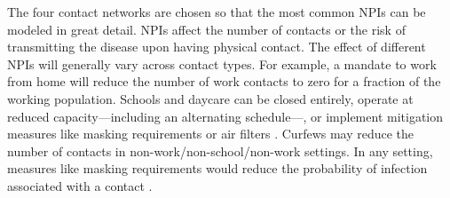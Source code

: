 The four contact networks are chosen so that the most common NPIs can be modeled in
great detail. NPIs affect the number of contacts or the risk of transmitting the disease
upon having physical contact. The effect of different NPIs will generally vary across
contact types. For example, a mandate to work from home will reduce the number of work
contacts to zero for a fraction of the working population. Schools and daycare can be
closed entirely, operate at reduced capacity---including an alternating schedule---, or
implement mitigation measures like masking requirements or air filters
\citep{Lessler2021}. Curfews may reduce the number of contacts in
non-work/non-school/non-work settings. In any setting, measures like masking
requirements would reduce the probability of infection associated with a contact
\citep{Cheng2021}.


